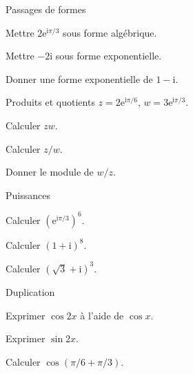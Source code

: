 \exercices
{}
\begingroup\renewcommand{\otBesoinPlace}[1]{}\begin{minipage}{\linewidth}
\begin{exercice}[1]{Passages de formes}

\begin{questions}
\item Mettre $2\mathrm e^{\mathrm i\pi/3}$ sous forme algébrique.
\item Mettre $-2\mathrm i$ sous forme exponentielle.
\item Donner une forme exponentielle de $1-\mathrm i$.
\end{questions}
\end{exercice}
\begin{exercice}[1]{Produits et quotients}
$z=2\mathrm e^{\mathrm i\pi/6}$, $w=3\mathrm e^{\mathrm i\pi/3}$.
\begin{questions}
\item Calculer $zw$.
\item Calculer $z/w$.
\item Donner le module de $w/z$.
\end{questions}
\end{exercice}
\begin{exercice}[1]{Puissances}

\begin{questions}
\item Calculer $(\mathrm e^{\mathrm i\pi/3})^6$.
\item Calculer $(1+\mathrm i)^8$.
\item Calculer $(\sqrt3+\mathrm i)^3$.
\end{questions}
\end{exercice}
\begin{exercice}[1]{Duplication}

\begin{questions}
\item Exprimer $\cos2x$ à l’aide de $\cos x$.
\item Exprimer $\sin2x$.
\item Calculer $\cos(\pi/6+\pi/3)$.
\end{questions}
\end{exercice}
\end{minipage}\endgroup
\clearpage
{}
